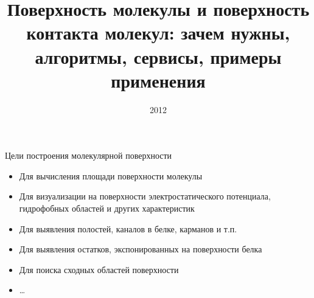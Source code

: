 \documentclass{beamer}
\title[Поверхность молекулы]{Поверхность молекулы и поверхность
    контакта молекул: зачем нужны, алгоритмы, сервисы, примеры применения}
\date{2012}
\begin{document}
    \begin{frame}
        \titlepage
    \end{frame}

    \begin{frame}{Цели построения молекулярной поверхности}
        \begin{itemize}
        \item Для вычисления площади поверхности молекулы
        \item Для визуализации на поверхности электростатического потенциала,
            гидрофобных областей и других характеристик
        \item Для выявления полостей, каналов в белке, карманов и т.п.
        \item Для выявления остатков, экспонированных на поверхности белка
        \item Для поиска сходных областей поверхности
        \item \dots
        \end{itemize}
    \end{frame}
\end{document}
